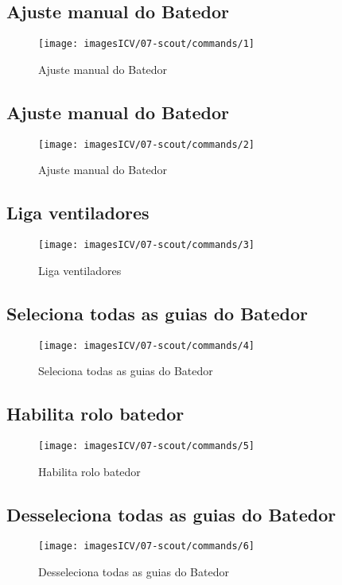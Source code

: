 \usepackage{graphicx}
\newpage
\thispagestyle{fancy}
\vspace{\fill}

\subsection{Ajuste manual do Batedor}
\begin{figure}
    \centering
    \texttt{[image: imagesICV/07-scout/commands/1]}
    \caption{Ajuste manual do Batedor}
\end{figure}
\newpage
\thispagestyle{fancy}
\vspace{\fill}

\subsection{Ajuste manual do Batedor}
\begin{figure}
    \centering
    \texttt{[image: imagesICV/07-scout/commands/2]}
    \caption{Ajuste manual do Batedor}
\end{figure}
\newpage
\thispagestyle{fancy}
\vspace{\fill}

\subsection{Liga ventiladores}
\begin{figure}
    \centering
    \texttt{[image: imagesICV/07-scout/commands/3]}
    \caption{Liga ventiladores}
\end{figure}
\newpage
\thispagestyle{fancy}
\vspace{\fill}

\subsection{Seleciona todas as guias do Batedor}
\begin{figure}
    \centering
    \texttt{[image: imagesICV/07-scout/commands/4]}
    \caption{Seleciona todas as guias do Batedor}
\end{figure}
\newpage
\thispagestyle{fancy}
\vspace{\fill}

\subsection{Habilita rolo batedor}
\begin{figure}
    \centering
    \texttt{[image: imagesICV/07-scout/commands/5]}
    \caption{Habilita rolo batedor}
\end{figure}
\newpage
\thispagestyle{fancy}
\vspace{\fill}

\subsection{Desseleciona todas as guias do Batedor}
\begin{figure}
    \centering
    \texttt{[image: imagesICV/07-scout/commands/6]}
    \caption{Desseleciona todas as guias do Batedor}
\end{figure}
